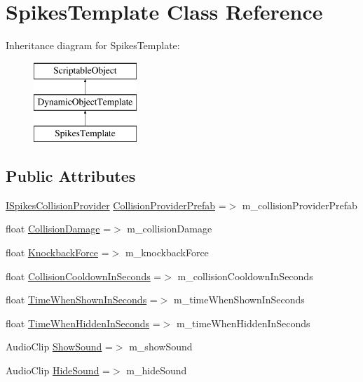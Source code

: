 \hypertarget{class_spikes_template}{}\section{Spikes\+Template Class Reference}
\label{class_spikes_template}
Inheritance diagram for Spikes\+Template\+:\begin{figure}[H]
\begin{center}
\leavevmode
\includegraphics[height=3.000000cm]{class_spikes_template}
\end{center}
\end{figure}
\subsection*{Public Attributes}
\begin{DoxyCompactItemize}
\item 
\mbox{\hyperlink{class_i_spikes_collision_provider}{I\+Spikes\+Collision\+Provider}} \mbox{\hyperlink{class_spikes_template_a27885cf1fd499437f2dda06a37e1b605}{Collision\+Provider\+Prefab}} =$>$ m\+\_\+collision\+Provider\+Prefab
\item 
float \mbox{\hyperlink{class_spikes_template_a2f1e276ab789844acc5516f68fd2a1b8}{Collision\+Damage}} =$>$ m\+\_\+collision\+Damage
\item 
float \mbox{\hyperlink{class_spikes_template_a3dd1c33d09daeb4cbef221d5f9583d44}{Knockback\+Force}} =$>$ m\+\_\+knockback\+Force
\item 
float \mbox{\hyperlink{class_spikes_template_a334b4b2056033af19bdc1faa80a3f16a}{Collision\+Cooldown\+In\+Seconds}} =$>$ m\+\_\+collision\+Cooldown\+In\+Seconds
\item 
float \mbox{\hyperlink{class_spikes_template_a645068ec66bef3253b9123990a2a5282}{Time\+When\+Shown\+In\+Seconds}} =$>$ m\+\_\+time\+When\+Shown\+In\+Seconds
\item 
float \mbox{\hyperlink{class_spikes_template_aeb808ae26eafa1722e16f125e8d6b16d}{Time\+When\+Hidden\+In\+Seconds}} =$>$ m\+\_\+time\+When\+Hidden\+In\+Seconds
\item 
Audio\+Clip \mbox{\hyperlink{class_spikes_template_a0a89f3817490f9757e6f1bb6734ca92e}{Show\+Sound}} =$>$ m\+\_\+show\+Sound
\item 
Audio\+Clip \mbox{\hyperlink{class_spikes_template_a233738f7240a4a8ffdddbd17344c2871}{Hide\+Sound}} =$>$ m\+\_\+hide\+Sound
\end{DoxyCompactItemize}


